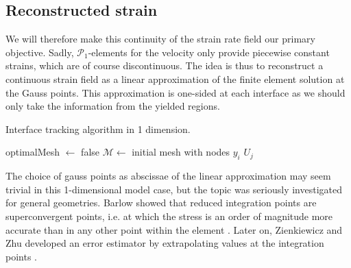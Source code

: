 \documentclass[11 pt]{report}
\begin{document}
\subsection{Reconstructed strain}

We will therefore make this continuity of the strain rate field our primary objective. Sadly, $\mathcal{P}_1$-elements for the velocity only provide piecewise constant strains, which are of course discontinuous. The idea is thus to reconstruct a continuous strain field as a linear approximation of the finite element solution at the Gauss points. This approximation is one-sided at each interface as we should only take the information from the yielded regions.

\begin{algorithm}[!b]
    \caption{Interface tracking algorithm in 1 dimension.}
    \label{alg:tacking_1d}
    optimalMesh $\gets$ false\;
    $\mathcal{M} \gets $ initial mesh with nodes $y_i$\;
    \Return $U_j$ 
\end{algorithm}

The choice of gauss points as abscissae of the linear approximation may seem trivial in this 1-dimensional model case, but the topic was seriously investigated for general geometries. Barlow showed that reduced integration points are superconvergent points, i.e. at which the stress is an order of magnitude more accurate than in any other point within the element \cite{Barlow}. Later on, Zienkiewicz and Zhu developed an error estimator by extrapolating values at the integration points \cite{Zienkiewicz}.
\end{document}
